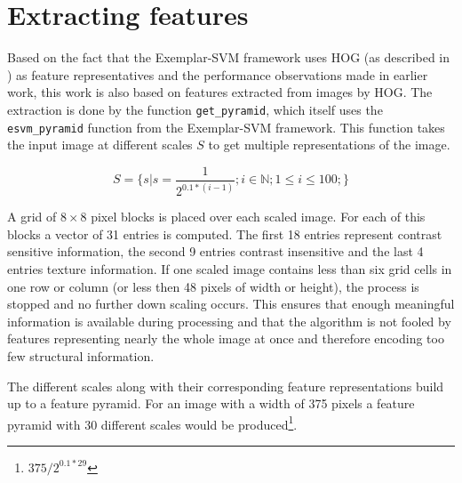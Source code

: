 \section{Extracting features}

Based on the fact that the Exemplar-SVM framework \cite{Malisiewicz2011} uses \ac{HOG} (as described in ) as feature representatives and the performance observations made in earlier work, this work is also based on features extracted from images by \ac{HOG}. The extraction is done by the function \verb|get_pyramid|, which itself uses the \verb|esvm_pyramid| function from the Exemplar-SVM framework. This function takes the input image at different scales $S$ to get multiple representations of the image.

\begin{equation}
S = \{s|s = \frac{1}{2^{0.1 * (i-1)}}; i \in \mathbb{N}; 1 \le i \le 100;\}
\end{equation}

A grid of $8\times8$ pixel blocks is placed over each scaled image. For each of this blocks a vector of 31 entries is computed. The first 18 entries represent contrast sensitive information, the second 9 entries contrast insensitive and the last 4 entries texture information. If one scaled image contains less than six grid cells in one row or column (or less then 48 pixels of width or height), the process is stopped and no further down scaling occurs. This ensures that enough meaningful information is available during processing and that the algorithm is not fooled by features representing nearly the whole image at once and therefore encoding too few structural information.
\par
The different scales along with their corresponding feature representations build up to a feature pyramid. For an image with a width of 375 pixels a feature pyramid with 30 different scales would be produced\footnote{$375/2^{0.1 * 29}$}. 

